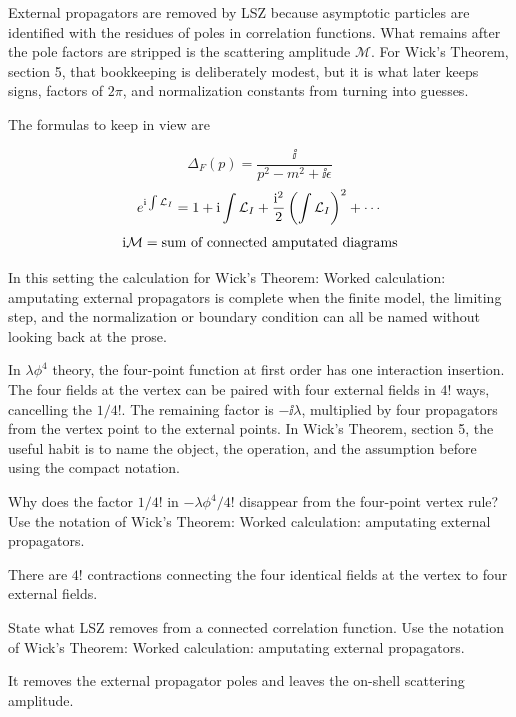 External propagators are removed by LSZ because asymptotic particles are identified with the residues of poles in correlation functions.  What remains after the pole factors are stripped is the scattering amplitude \(\mathcal M\).  For Wick's Theorem, section 5, that bookkeeping is deliberately modest, but it is what later keeps signs, factors of \(2\pi\), and normalization constants from turning into guesses.

The formulas to keep in view are

\[
  \Delta_F(p)=\frac{\ii}{p^2-m^2+\ii\epsilon}
\]
\[
  e^{\mathrm i\int\mathcal L_I}=1+\mathrm i\int\mathcal L_I+\frac{\mathrm i^2}{2}\left(\int\mathcal L_I\right)^2+\cdots
\]
\[
  \mathrm i\mathcal M=\hbox{sum of connected amputated diagrams}
\]

In this setting the calculation for Wick's Theorem: Worked calculation: amputating external propagators is complete when the finite model, the limiting step, and the normalization or boundary condition can all be named without looking back at the prose.




\begin{example}
In \(\lambda\phi^4\) theory, the four-point function at first order has one interaction insertion.  The four fields at the vertex can be paired with four external fields in \(4!\) ways, cancelling the \(1/4!\).  The remaining factor is \(-\ii\lambda\), multiplied by four propagators from the vertex point to the external points.  In Wick's Theorem, section 5, the useful habit is to name the object, the operation, and the assumption before using the compact notation.
\end{example}



\begin{exercise}
Why does the factor \(1/4!\) in \(-\lambda\phi^4/4!\) disappear from the four-point vertex rule?  Use the notation of Wick's Theorem: Worked calculation: amputating external propagators.
\begin{answer}
There are \(4!\) contractions connecting the four identical fields at the vertex to four external fields.
\end{answer}
\end{exercise}

\begin{exercise}
State what LSZ removes from a connected correlation function.  Use the notation of Wick's Theorem: Worked calculation: amputating external propagators.
\begin{answer}
It removes the external propagator poles and leaves the on-shell scattering amplitude.
\end{answer}
\end{exercise}



